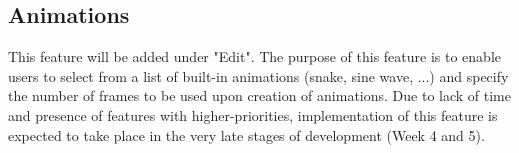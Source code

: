 \documentclass[preprint,12pt]{article}
\begin{document}
\subsection*{Animations}

{This feature will be added under "Edit". The purpose of this feature is to enable users to select from a list of built-in animations (snake, sine wave, ...) and specify the number of frames to be used upon creation of animations. Due to lack of time and presence of features with higher-priorities, implementation of this feature is expected to take place in the very late stages of development (Week 4 and 5). }
\end{document}
